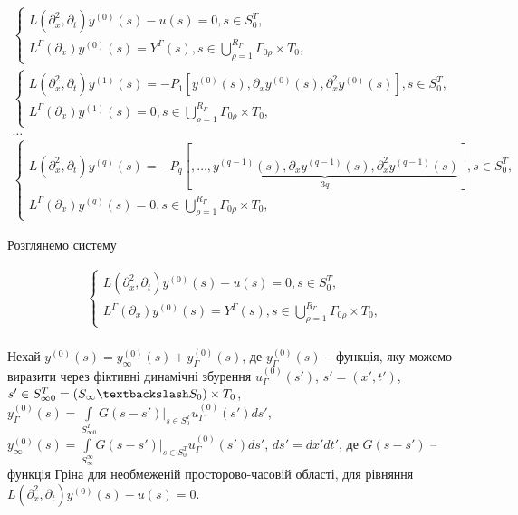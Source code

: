 \begin{gather*}
    \left\{
    \begin{alignedat}{2}
        L(\partial_x^2, \partial_t)y^{(0)}(s) - u(s) = 0, s\in S_{0}^T, \\
        L^{\Gamma}(\partial_{x})y^{(0)}(s) = Y^{\Gamma}(s),s\in\bigcup\limits_{\rho=1}^{R_{\Gamma}} \Gamma_{0\rho}\times T_{0},
    \end{alignedat}
    \right.\\
    \left\{
    \begin{alignedat}{2}
        L(\partial_x^2, \partial_t)y^{(1)}(s) = - P_{1}\left[
        y^{(0)}(s), \partial_x y^{(0)}(s), \partial_x^2 y^{(0)}(s)
        \right], s\in S_{0}^T, \\
        L^{\Gamma}(\partial_{x})y^{(1)}(s) = 0,s\in\bigcup\limits_{\rho=1}^{R_{\Gamma}} \Gamma_{0\rho}\times T_{0},
    \end{alignedat}
    \right.\\
    \dots\\
    \left\{
    \begin{alignedat}{2}
        L(\partial_x^2, \partial_t)y^{(q)}(s) = - P_{q}\left[
            \underbrace{
                ,\dots,
                y^{(q-1)}(s), \partial_x y^{(q-1)}(s), \partial_x^2 y^{(q-1)}(s)
            }_{3q}
        \right], s\in S_{0}^T, \\
        L^{\Gamma}(\partial_{x})y^{(q)}(s) = 0,s\in\bigcup\limits_{\rho=1}^{R_{\Gamma}} \Gamma_{0\rho}\times T_{0},
    \end{alignedat}
    \right.
\end{gather*}

Розглянемо систему

\begin{gather*}
    \left\{
    \begin{alignedat}{2}
        L(\partial_x^2, \partial_t)y^{(0)}(s) - u(s) = 0, s\in S_{0}^T, \\
        L^{\Gamma}(\partial_{x})y^{(0)}(s) = Y^{\Gamma}(s),s\in\bigcup\limits_{\rho=1}^{R_{\Gamma}} \Gamma_{0\rho}\times T_{0},
    \end{alignedat}
    \right.\\
\end{gather*}

Нехай $y^{(0)}(s)=y^{(0)}_{\infty}(s) + y^{(0)}_{\Gamma}(s)$,
де $y^{(0)}_{\Gamma}(s)$ -- функція, яку можемо виразити через фіктивні динамічні збурення
$u^{(0)}_{\Gamma}(s')$, $s'=(x', t')$, $s'\in S^{T}_{\infty 0}=(S_{\infty} \textbackslash S_{0})\times T_{0}$,
$y^{(0)}_{\Gamma}(s) = \int\limits_{S^{T}_{\infty 0}}G(s-s')\bigg|_{s\in S^{T}_{0}}u^{(0)}_{\Gamma}(s')ds'$,
$y^{(0)}_{\infty}(s) = \int\limits_{S^{\infty}_{\infty}}G(s-s')\bigg|_{s\in S^{T}_{0}}u^{(0)}_{\Gamma}(s')ds'$,
$ds'=dx'dt'$, де $G(s-s')$ -- функція Гріна для необмеженій просторово-часовій області, для рівняння
$L(\partial^{2}_{x}, \partial_{t})y^{(0)}(s) - u(s) = 0$.


